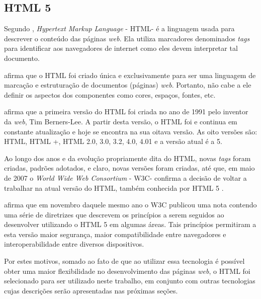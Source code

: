 \subsection{HTML 5}

Segundo , \textit{Hypertext Markup Language}  - HTML\footnotemark[26] - é a linguagem usada para descrever o conteúdo das páginas \textit{web}. Ela utiliza marcadores denominados \textit{tags} para identificar aos navegadores de internet como eles devem interpretar tal documento.


 afirma que o HTML foi criado única e exclusivamente para ser uma linguagem de marcação e estruturação de documentos (páginas) \textit{web}. Portanto, não cabe a ele definir os aspectos dos componentes como cores, espaços, fontes, etc.

 afirma que a primeira versão do HTML foi criada no ano de 1991 pelo inventor da \textit{web}, Tim Berners-Lee. A partir desta versão, o HTML foi e continua em constante atualização e hoje se encontra na sua oitava versão. As oito versões são: HTML, HTML +, HTML 2.0, 3.0, 3.2, 4.0, 4.01 e a versão atual é a 5.

Ao longo dos anos e da evolução propriamente dita do HTML, novas \textit{tags} foram criadas, padrões adotados, e claro, novas versões foram criadas, até que, em maio de 2007  o \textit{World Wide Web Consortium} - W3C\footnotemark[27] - confirma a decisão de voltar a trabalhar na atual versão do HTML, também conhecida por HTML 5 \cite{w3c_html_fundamentals}.


 afirma que em novembro daquele mesmo ano o W3C publicou uma nota contendo uma série de diretrizes que descrevem os princípios a serem seguidos ao desenvolver utilizando o HTML 5 em algumas áreas. Tais princípios permitiram a esta versão maior segurança, maior compatibilidade entre navegadores e interoperabilidade entre diversos dispositivos.

Por estes motivos, somado ao fato de que ao utilizar essa tecnologia é possível obter uma maior flexibilidade no desenvolvimento das páginas \textit{web}, o HTML foi selecionado para ser utilizado neste trabalho, em conjunto com outras tecnologias cujas descrições serão apresentadas nas próximas seções.